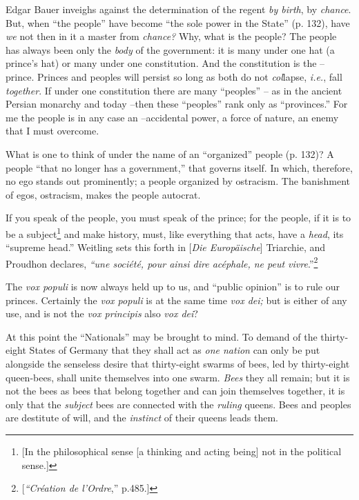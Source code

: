 Edgar Bauer inveighs against the determination of the regent \textit{by 
birth}, by \textit{chance}. But, when ``the people'' have become ``the sole 
power in the State'' (p. 132), have \textit{we} not then in it a master from 
\textit{chance?} Why, what is the people? The people has always been only the 
\textit{body} of the government: it is many under one hat (a prince's hat) or 
many under one constitution. And the constitution is the -- prince. Princes 
and peoples will persist so long as both do not \textit{col}lapse, \textit{i.e.}, 
fall \textit{together}. If under one constitution there are many 
``peoples'' -- as in the ancient Persian monarchy and today --then these 
``peoples'' rank only as ``provinces.'' For me the people is in any case 
an --accidental power, a force of nature, an enemy that I must overcome.

What is one to think of under the name of an ``organized'' people (p. 132)? 
A people ``that no longer has a government,'' that governs itself. In which, 
therefore, no ego stands out prominently; a people organized by ostracism. The 
banishment of egos, ostracism, makes the people autocrat.

If you speak of the people, you must speak of the prince; for the people, if 
it is to be a subject\footnote{[In the philosophical sense [a thinking and 
acting being] not in the political sense.]} and make history, must, like 
everything that acts, have a \textit{head}, its ``supreme head.'' Weitling 
sets this forth in [\textit{Die Europ\"aische}] Triarchie, and Proudhon 
declares, \textit{``une soci\'et\'e, pour ainsi dire ac\'ephale, ne peut 
vivre}.''\footnote{[\textit{``Cr\'eation de l'Ordre},'' p.485.]}

The \textit{vox populi} is now always held up to us, and ``public opinion'' 
is to rule our princes. Certainly the \textit{vox populi} is at the same time 
\textit{vox dei;} but is either of any use, and is not the \textit{vox 
principis} also \textit{vox dei}?

At this point the ``Nationals'' may be brought to mind. To demand of the 
thirty-eight States of Germany that they shall act as \textit{one nation} can 
only be put alongside the senseless desire that thirty-eight swarms of bees, 
led by thirty-eight queen-bees, shall unite themselves into one swarm. 
\textit{Bees} they all remain; but it is not the bees as bees that belong 
together and can join themselves together, it is only that the 
\textit{subject} bees are connected with the \textit{ruling} queens. Bees and 
peoples are destitute of will, and the \textit{instinct} of their queens leads 
them.

